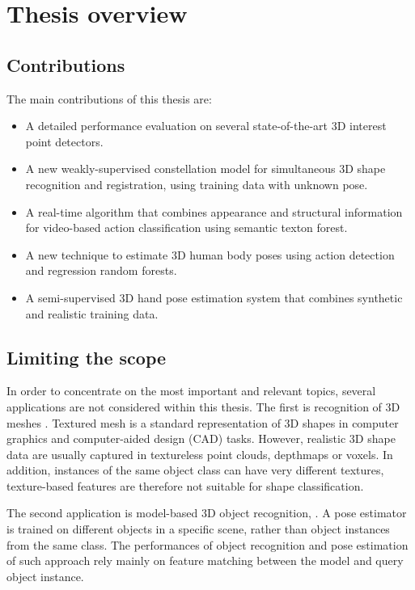 \section{Thesis overview}

\subsection{Contributions}

The main contributions of this thesis are:
\begin{itemize}
	\item A detailed performance evaluation on several state-of-the-art 3D interest point detectors.
	\item A new weakly-supervised constellation model for simultaneous 3D shape recognition and registration, using training data with unknown pose. 
	\item A real-time algorithm that combines appearance and structural information for video-based action classification using semantic texton forest. 
	\item A new technique to estimate 3D human body poses using action detection and regression random forests. 
	\item A semi-supervised 3D hand pose estimation system that combines synthetic and realistic training data. 
\end{itemize}

\subsection{Limiting the scope}

In order to concentrate on the most important and relevant topics, 
several applications are not considered within this thesis. 
The first is recognition of 3D meshes \cite{Zaharescu2009, Bronstein2011, Kokkinos2012}. Textured mesh is a standard representation of 3D shapes in computer graphics and computer-aided design (CAD) tasks. However, realistic 3D shape data are usually captured in textureless point clouds, depthmaps or voxels. In addition, instances of the same object class can have very different textures, texture-based features are therefore not suitable for shape classification.      

The second application is model-based 3D object recognition, \eg \cite{Mian2006, Rothganger2006, Shang2010}. A pose estimator is trained on different objects in a specific scene, rather than object instances from the same class. The performances of object recognition and pose estimation of such approach rely mainly on feature matching between the model and query object instance. 

